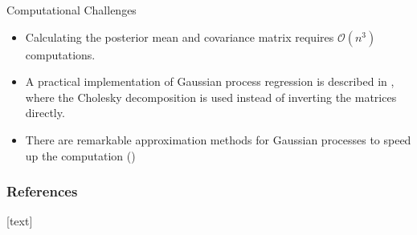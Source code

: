 \documentclass[10pt]{beamer}
\begin{document}
\begin{frame}{Computational Challenges}
\begin{itemize}
\item Calculating the posterior mean and covariance matrix requires $\mathcal{O}(n^3)$ computations. 
\item A practical implementation of Gaussian process regression is described in \cite[Algorithm 2.1]{RW05}, where the Cholesky decomposition is used instead of inverting the matrices directly. 
\item There are remarkable approximation methods for Gaussian processes to speed up the computation (\cite[Chapter 20.1]{BDA13})
\end{itemize}
\end{frame}



\begin{frame}[t, allowframebreaks]
\frametitle{References}
\footnotesize{
[text]

 
}
\end{frame}
\end{document}

